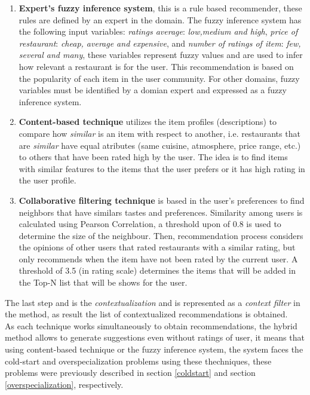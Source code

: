 \begin{enumerate} 
\item \textbf{Expert's fuzzy inference system}, 
this is a rule based recommender, these rules are defined by 
an expert in the domain. The
fuzzy inference system has the following input variables:
\textit{ratings average}:  \textit{low,medium and high}, \textit{price
of restaurant}:  \textit{cheap, average and expensive}, and
\textit{number of ratings of item}:  \textit{few, several and many},
these variables represent fuzzy values and are used to infer how
relevant a restaurant is for the  user. This recommendation is based
on the popularity of each  item in the user community. For other
domains, fuzzy variables must be identified by a domian expert and
expressed as a fuzzy inference system.
\item \textbf{Content-based technique} 
utilizes the item profiles (descriptions) to compare how
\textit{similar} is an item with respect to  another, i.e. restaurants
that are \textit{similar} have equal atributes (same cuisine,  atmosphere, price range,
etc.) to others that have been rated high by the user.  The idea is to find items
with similar features to the items that the  user prefers or it has
high rating in the user profile. 
\item \textbf{Collaborative filtering technique} 
is based in the user's preferences  to find neighbors that
have similars tastes and preferences. Similarity among users is
calculated using Pearson Correlation, a threshold upon of 0.8 is used
to determine the size of the neighbour. Then, recommendation process
considers the opinions of other users that rated restaurants with a
similar rating, but only recommends when the item have not been rated
by the current user. A threshold of 3.5 (in rating scale) determines
the items that will be added in the Top-N list that will be shows for
the user. 
\end{enumerate}  
The last step and is the \textit{contextualization} and is
represented as a \textit{context filter} in the method, as result the
list of contextualized recommendations is obtained. \\ As each
technique works simultaneously to obtain recommendations, the hybrid
method allows to generate suggestions even without  ratings of user,
it means that using content-based technique or the fuzzy inference system, 
the system faces the cold-start and overspecialization
problems using these thechniques, these problems were previously
described in section  \ref{coldstart} and  
section  \ref{overspecialization}, respectively.\\ 
